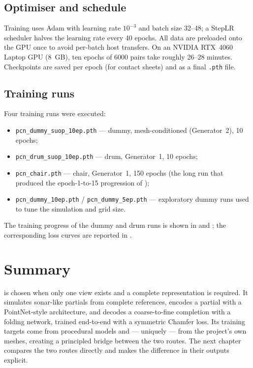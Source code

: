 \subsection{Optimiser and schedule}
Training uses Adam \citep{kingma2015adam} with learning rate $10^{-3}$ and
batch size 32--48; a StepLR scheduler halves the learning rate every 40 epochs.
All data are preloaded onto the GPU once to avoid per-batch host transfers. On
an NVIDIA RTX~4060 Laptop GPU (8~GB), ten epochs of 6000 pairs take roughly
26--28 minutes. Checkpoints are saved per epoch (for contact sheets) and as a
final \texttt{.pth} file.

\subsection{Training runs}
\label{sec:routeB_runs}
Four training runs were executed:

\begin{itemize}
  \item \texttt{pcn\_dummy\_suop\_10ep.pth} --- dummy, mesh-conditioned
  (Generator~2), 10 epochs;
  \item \texttt{pcn\_drum\_suop\_10ep.pth} --- drum, Generator~1, 10 epochs;
  \item \texttt{pcn\_chair.pth} --- chair, Generator~1, 150 epochs
  (the long run that produced the epoch-1-to-15 progression of
  );
  \item \texttt{pcn\_dummy\_10ep.pth} / \texttt{pcn\_dummy\_5ep.pth} ---
  exploratory dummy runs used to tune the simulation and grid size.
\end{itemize}

The training progress of the dummy and drum runs is shown in
 and ; the corresponding loss
curves are reported in .

\section{Summary}
\label{sec:routeB_summary}

\routeB{} is chosen when only one view exists and a complete representation is
required. It simulates sonar-like partials from complete references, encodes a
partial with a PointNet-style architecture, and decodes a coarse-to-fine
completion with a folding network, trained end-to-end with a symmetric Chamfer
loss. Its training targets come from procedural models and --- uniquely ---
from the project's own \routeA{} meshes, creating a principled bridge between
the two routes. The next chapter compares the two routes directly and makes
the difference in their outputs explicit.
